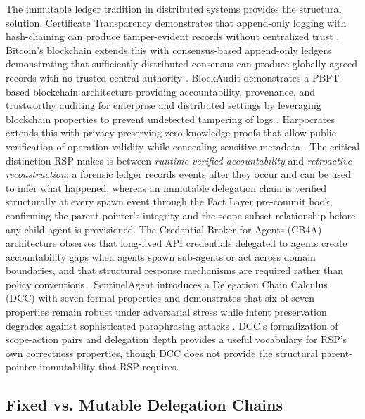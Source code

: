 The immutable ledger tradition in distributed systems provides the structural solution. Certificate Transparency demonstrates that append-only logging with hash-chaining can produce tamper-evident records without centralized trust \cite{laurie2013certificate}. Bitcoin's blockchain extends this with consensus-based append-only ledgers demonstrating that sufficiently distributed consensus can produce globally agreed records with no trusted central authority \cite{nakamoto2008bitcoin}. BlockAudit demonstrates a PBFT-based blockchain architecture providing accountability, provenance, and trustworthy auditing for enterprise and distributed settings by leveraging blockchain properties to prevent undetected tampering of logs \cite{blockaudit}. Harpocrates extends this with privacy-preserving zero-knowledge proofs that allow public verification of operation validity while concealing sensitive metadata \cite{harpocrates}. The critical distinction RSP makes is between \emph{runtime-verified accountability} and \emph{retroactive reconstruction}: a forensic ledger records events after they occur and can be used to infer what happened, whereas an immutable delegation chain is verified structurally at every spawn event through the Fact Layer pre-commit hook, confirming the parent pointer's integrity and the scope subset relationship before any child agent is provisioned. The Credential Broker for Agents (CB4A) architecture observes that long-lived API credentials delegated to agents create accountability gaps when agents spawn sub-agents or act across domain boundaries, and that structural response mechanisms are required rather than policy conventions \cite{draft-cb4a}. SentinelAgent introduces a Delegation Chain Calculus (DCC) with seven formal properties and demonstrates that six of seven properties remain robust under adversarial stress while intent preservation degrades against sophisticated paraphrasing attacks \cite{arxiv-sentinel-agent}. DCC's formalization of scope-action pairs and delegation depth provides a useful vocabulary for RSP's own correctness properties, though DCC does not provide the structural parent-pointer immutability that RSP requires.

\subsection{Fixed vs. Mutable Delegation Chains}

